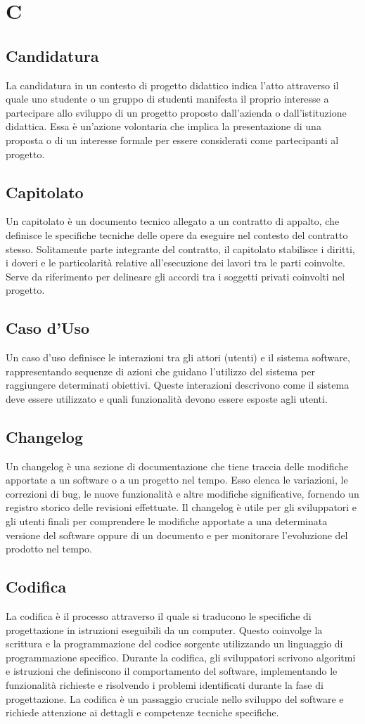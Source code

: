 \section{C}
\subsection{Candidatura}
La candidatura in un contesto di progetto didattico indica l'atto attraverso il
quale uno studente o un gruppo di studenti manifesta il proprio interesse a
partecipare allo sviluppo di un progetto proposto dall'azienda o
dall'istituzione didattica. Essa è un'azione volontaria che implica la
presentazione di una proposta o di un interesse formale per essere considerati
come partecipanti al progetto.
\subsection{Capitolato}
Un capitolato è un documento tecnico allegato a un contratto di appalto, che
definisce le specifiche tecniche delle opere da eseguire nel contesto del
contratto stesso. Solitamente parte integrante del contratto, il capitolato
stabilisce i diritti, i doveri e le particolarità relative all'esecuzione dei
lavori tra le parti coinvolte. Serve da riferimento per delineare gli accordi
tra i soggetti privati coinvolti nel progetto.
\subsection{Caso d'Uso}
Un caso d'uso definisce le interazioni tra gli attori (utenti) e il sistema
software, rappresentando sequenze di azioni che guidano l'utilizzo del sistema
per raggiungere determinati obiettivi. Queste interazioni descrivono come il
sistema deve essere utilizzato e quali funzionalità devono essere esposte agli
utenti.
\subsection{Changelog}
Un changelog è una sezione di documentazione che tiene traccia delle modifiche
apportate a un software o a un progetto nel tempo. Esso elenca le variazioni,
le correzioni di bug, le nuove funzionalità e altre modifiche significative,
fornendo un registro storico delle revisioni effettuate. Il changelog è utile
per gli sviluppatori e gli utenti finali per comprendere le modifiche apportate
a una determinata versione del software oppure di un documento e per monitorare
l'evoluzione del prodotto nel tempo.
\subsection{Codifica}
La codifica è il processo attraverso il quale si traducono le specifiche di
progettazione in istruzioni eseguibili da un computer. Questo coinvolge la
scrittura e la programmazione del codice sorgente utilizzando un linguaggio di
programmazione specifico. Durante la codifica, gli sviluppatori scrivono
algoritmi e istruzioni che definiscono il comportamento del software,
implementando le funzionalità richieste e risolvendo i problemi identificati
durante la fase di progettazione. La codifica è un passaggio cruciale nello
sviluppo del software e richiede attenzione ai dettagli e competenze tecniche
specifiche.
